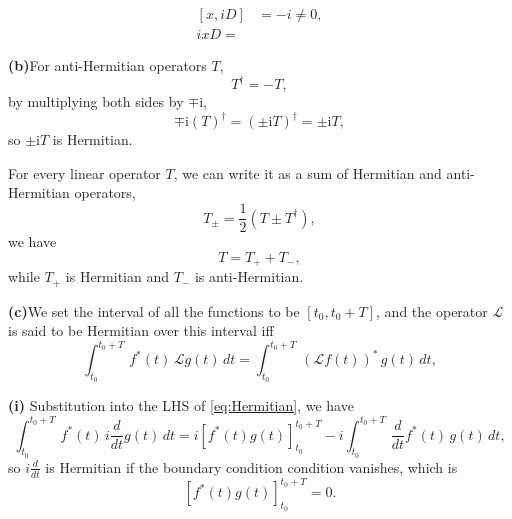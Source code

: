 \documentclass[12pt]{article}
\begin{document}
\smallbreak
\smallbreak
\begin{equation}
\begin{aligned}
    [x, iD] &= -i \ne 0,\\
    ixD = 
\end{aligned}
\end{equation}


\noindent\textbf{(b)}\quad For anti-Hermitian operators $T$, 
\begin{equation}
    T^{\dagger} = -T,
\end{equation}
by multiplying both sides by $\mp \mathrm{i}$,
\begin{equation}
    \mp \mathrm{i} (T)^{\dagger} = \left(\pm \mathrm{i} T \right)^{\dagger} = \pm \mathrm{i} T,
\end{equation}
so $\pm \mathrm{i} T$ is Hermitian.

\smallskip
\smallskip

For every linear operator $T$, we can write it as a sum of Hermitian and anti-Hermitian operators,
\begin{equation}
    T_{\pm} = \frac{1}{2} (T \pm T^{\dagger}),
\end{equation}
we have
\begin{equation}
    T = T_{+} + T_{-},
\end{equation}
while $T_{+}$ is Hermitian and $T_{-}$ is anti-Hermitian.

\pagebreak
\noindent\textbf{(c)}\quad We set the interval of all the functions to be $[t_0, t_0+T]$, and the operator $\mathcal{L}$ is said to be Hermitian over this interval iff 
\begin{equation}
    \int_{t_0}^{t_0+T} \, f^*(t) \, \mathcal{L} g(t) \, dt = \int_{t_0}^{t_0+T} \, (\mathcal{L} f(t))^* \, g(t) \, dt,
    \label{eq:Hermitian}
\end{equation}



\textbf{(i)} \quad Substitution into the LHS of \eqref{eq:Hermitian}, we have
\begin{equation}
    \int_{t_0}^{t_0+T} \, f^*(t) \, i \frac{d}{dt} g(t) \, dt = i \left[ f^*(t) g(t) \right]_{t_0}^{t_0+T} - i \int_{t_0}^{t_0+T} \, \frac{d}{dt} f^*(t) \, g(t) \, dt,
\end{equation}
so $i \frac{d}{dt}$ is Hermitian if the boundary condition condition vanishes, which is
\begin{equation}
    \left[ f^*(t) g(t) \right]_{t_0}^{t_0+T} = 0.
\end{equation}
\end{document}
